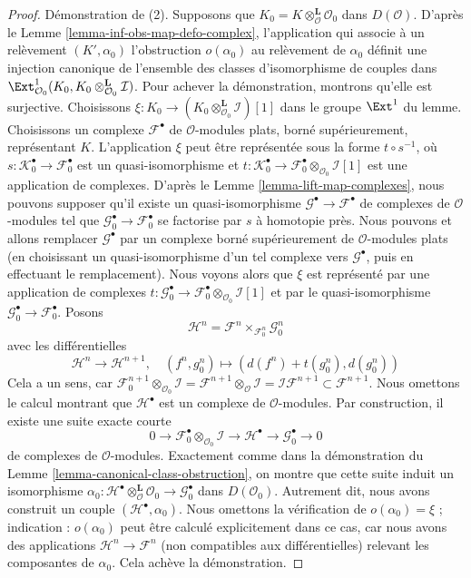 \begin{proof}
\medskip\noindent
Démonstration de (2).
Supposons que $K_0 = K \otimes_\mathcal{O}^\mathbf{L} \mathcal{O}_0$ dans
$D(\mathcal{O})$. D'après le
Lemme \ref{lemma-inf-obs-map-defo-complex}, l'application qui associe à un
relèvement $(K', \alpha_0)$ l'obstruction $o(\alpha_0)$ au relèvement de
$\alpha_0$ définit une injection canonique de l'ensemble des classes
d'isomorphisme de couples dans
$\Ext^1_{\mathcal{O}_0}(K_0,
K_0 \otimes_{\mathcal{O}_0}^\mathbf{L} \mathcal{I})$.
Pour achever la démonstration, montrons qu'elle est surjective.
Choisissons
$\xi : K_0 \to (K_0 \otimes_{\mathcal{O}_0}^\mathbf{L} \mathcal{I})[1]$
dans le groupe $\Ext^1$ du lemme.
Choisissons un complexe $\mathcal{F}^\bullet$ de $\mathcal{O}$-modules plats,
borné supérieurement, représentant $K$.
L'application $\xi$ peut être représentée sous la forme $t \circ s^{-1}$, où
$s : \mathcal{K}_0^\bullet \to \mathcal{F}_0^\bullet$ est un
quasi-isomorphisme et
$t : \mathcal{K}_0^\bullet \to
\mathcal{F}_0^\bullet \otimes_{\mathcal{O}_0} \mathcal{I}[1]$ est une
application de complexes.
D'après le Lemme \ref{lemma-lift-map-complexes}, nous pouvons supposer qu'il
existe un quasi-isomorphisme
$\mathcal{G}^\bullet \to \mathcal{F}^\bullet$ de complexes de
$\mathcal{O}$-modules tel que
$\mathcal{G}_0^\bullet \to \mathcal{F}_0^\bullet$ se factorise par $s$ à
homotopie près.
Nous pouvons et allons remplacer $\mathcal{G}^\bullet$ par un complexe borné
supérieurement de $\mathcal{O}$-modules plats (en choisissant un
quasi-isomorphisme d'un tel complexe vers $\mathcal{G}^\bullet$, puis en
effectuant le remplacement).
Nous voyons alors que $\xi$ est représenté par une application de complexes
$t : \mathcal{G}_0^\bullet \to
\mathcal{F}_0^\bullet \otimes_{\mathcal{O}_0} \mathcal{I}[1]$ et par le
quasi-isomorphisme
$\mathcal{G}_0^\bullet \to \mathcal{F}_0^\bullet$.
Posons
$$
\mathcal{H}^n = \mathcal{F}^n \times_{\mathcal{F}_0^n} \mathcal{G}_0^n
$$
avec les différentielles
$$
\mathcal{H}^n \to \mathcal{H}^{n + 1},\quad
(f^n, g_0^n) \mapsto (d(f^n) + t(g_0^n), d(g_0^n))
$$
Cela a un sens, car
$\mathcal{F}_0^{n + 1} \otimes_{\mathcal{O}_0} \mathcal{I} =
\mathcal{F}^{n + 1} \otimes_\mathcal{O} \mathcal{I} =
\mathcal{I}\mathcal{F}^{n + 1} \subset \mathcal{F}^{n + 1}$.
Nous omettons le calcul montrant que $\mathcal{H}^\bullet$ est un complexe de
$\mathcal{O}$-modules. Par construction, il existe une suite exacte courte
$$
0 \to \mathcal{F}_0^\bullet \otimes_{\mathcal{O}_0} \mathcal{I} \to
\mathcal{H}^\bullet \to \mathcal{G}_0^\bullet \to 0
$$
de complexes de $\mathcal{O}$-modules.
Exactement comme dans la démonstration du
Lemme \ref{lemma-canonical-class-obstruction}, on montre que cette suite induit
un isomorphisme
$\alpha_0 :
\mathcal{H}^\bullet \otimes_\mathcal{O}^\mathbf{L} \mathcal{O}_0 \to
\mathcal{G}_0^\bullet$ dans $D(\mathcal{O}_0)$.
Autrement dit, nous avons construit un couple
$(\mathcal{H}^\bullet, \alpha_0)$.
Nous omettons la vérification de $o(\alpha_0) = \xi$ ; indication :
$o(\alpha_0)$ peut être calculé explicitement dans ce cas, car nous avons des
applications $\mathcal{H}^n \to \mathcal{F}^n$ (non compatibles aux
différentielles) relevant les composantes de $\alpha_0$.
Cela achève la démonstration.
\end{proof}
